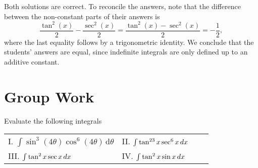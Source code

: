 \documentclass[]{ximera}
\begin{document}
\begin{freeResponse}
Both solutions are correct. To reconcile the answers, note that the difference between the non-constant parts of their answers is 
$$
\frac{\tan^2 (x)}{2} - \frac{\sec^2(x)}{2} = \frac{\tan^2(x) - \sec^2(x)}{2}  = -\frac{1}{2},
$$
where the last equality follows by a trigonometric identity. We conclude that the students' answers are equal, since indefinite integrals are only defined up to an additive constant.
\end{freeResponse}

\section{Group Work}

\begin{problem}
Evaluate the following integrals

\begin{center}
\begin{tabular}{llll}
I. $\displaystyle\int \sin^3 (4 \theta) \cos^6 (4\theta) \, \mathrm{d}\theta$ \hspace{.2in} & II. $\int \tan^{23} x \sec^6 x \mathop{}\!d x$ \\
III. $\int \tan^2 x \sec x \mathop{}\!d x$ \hspace{.2in} &  IV. $\int \tan^2 x \sin x \mathop{}\!d x$
\end{tabular}
\end{center}
\end{problem}
\end{document}
